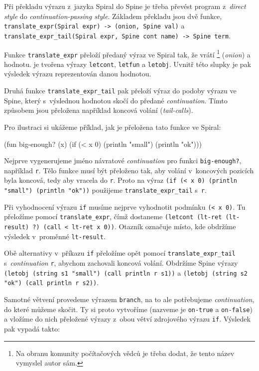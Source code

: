 Při překladu výrazu z~jazyka Spiral do Spine je třeba převést program
z~\emph{direct style} do \emph{continuation-passing style}. Základem překladu
jsou dvě funkce, \texttt{translate_expr(Spiral expr) -> (onion, Spine val)} a
\texttt{translate_expr_tail(Spiral expr, Spine cont name) -> Spine term}.

Funkce \texttt{translate_expr} přeloží předaný výraz ve Spiral tak, že vrátí
\footnote{Na obranu komunity počítačových vědců je třeba dodat, že
tento název vymyslel autor sám.} (\emph{onion}) a hodnotu.  je
tvořena výrazy \texttt{letcont}, \texttt{letfun} a \texttt{letobj}. Uvnitř této
slupky je pak výsledek výrazu reprezentován danou hodnotou.

Druhá funkce \texttt{translate_expr_tail} pak přeloží výraz do podoby výrazu ve
Spine, který s~výslednou hodnotou skočí do předané \emph{continuation}. Tímto
způsobem jsou přeložena například koncová volání (\emph{tail-calls}).

Pro ilustraci si ukážeme příklad, jak je přeložena tato funkce ve Spiral:

\begin{spiral}
(fun big-enough? (x)
  (if (< x 0)
    (println "small")
    (println "ok")))
\end{spiral}

Nejprve vygenerujeme jméno návratové \emph{continuation} pro funkci
\texttt{big-enough?}, například \texttt{r}. Tělo funkce musí být přeloženo tak,
aby volání v~koncových pozicích byla koncová, tedy aby vracela do \texttt{r}.
Proto na výraz \texttt{(if (< x 0) (println "small") (println "ok"))} použijeme
\texttt{translate_expr_tail} s~\texttt{r}.

Při vyhodnocení výrazu \texttt{if} musíme nejprve vyhodnotit podmínku \texttt{(<
x 0)}. Tu přeložíme pomocí \texttt{translate_expr}, čímž dostaneme 
\texttt{(letcont (lt-ret (lt-result) ?) (call < lt-ret x 0))}. Otazník označuje
místo, kde obdržíme výsledek v~proměnné \texttt{lt-result}.

Obě alternativy v~příkazu \texttt{if} přeložíme opět pomocí
\texttt{translate_expr_tail} s~\emph{continuation} \texttt{r}, abychom zachovali
koncová volání. Obdržíme Spine výrazy \texttt{(letobj (string s1 "small") (call
println r s1))} a \texttt{(letobj (string s2 "ok") (call println r s2))}.

Samotné větvení provedeme výrazem \texttt{branch}, na to ale potřebujeme
\emph{continuation}, do které můžeme skočit. Ty si proto vytvoříme (nazveme je 
\texttt{on-true} a \texttt{on-false}) a vložíme do nich přeložené výrazy z~obou
větví zdrojového výrazu \texttt{if}. Výsledek pak vypadá takto:


